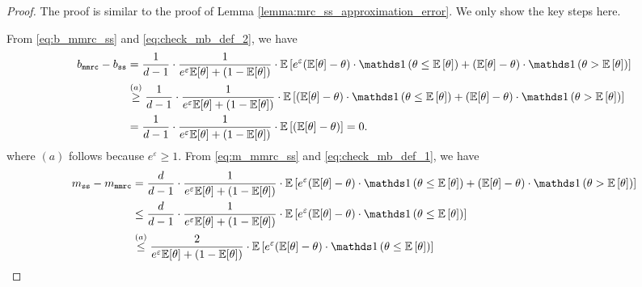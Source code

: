 \begin{proof}
The proof is similar to the proof of Lemma \ref{lemma:mrc_ss_approximation_error}. We only show the key steps here.

From \eqref{eq:b_mmrc_ss} and \eqref{eq:check_mb_def_2}, we have
\begin{align}
    b_\texttt{mmrc} - b_{\texttt{ss}} & =  \frac{1}{d-1} \cdot \frac{1}{e^\varepsilon \E [\theta] +(1-\E [\theta] )} \cdot \E\lb e^\varepsilon (\E [\theta]  - \theta) \cdot \Indicator \lp \theta \leq \E\lb \theta \rb \rp + (\E [\theta]  - \theta) \cdot \Indicator \lp \theta > \E\lb \theta \rb \rp \rb \\
    & \stackrel{(a)}{\geq} \frac{1}{d-1} \cdot \frac{1}{e^\varepsilon \E [\theta] +(1-\E [\theta] )} \cdot \E\lb  (\E [\theta]  - \theta) \cdot \Indicator \lp \theta \leq \E\lb \theta \rb \rp + (\E [\theta]  - \theta) \cdot \Indicator \lp \theta > \E\lb \theta \rb \rp \rb \\
    & = \frac{1}{d-1} \cdot \frac{1}{e^\varepsilon \E [\theta] +(1-\E [\theta] )} \cdot \E\lb (\E [\theta]  - \theta) \rb = 0.
\end{align}
where $(a)$ follows because $e^\varepsilon \geq 1$.
From \eqref{eq:m_mmrc_ss} and \eqref{eq:check_mb_def_1}, we have
\begin{align}
    m_{\texttt{ss}} - m_\texttt{mmrc} & = \frac{d}{d-1} \cdot \frac{1}{e^\varepsilon \E [\theta] +(1-\E [\theta] )} \cdot \E\lb e^\varepsilon (\E [\theta]  - \theta) \cdot \Indicator \lp \theta \leq \E\lb \theta \rb \rp + (\E [\theta]  - \theta) \cdot \Indicator \lp \theta > \E\lb \theta \rb \rp \rb \\
    & \leq \frac{d}{d-1} \cdot \frac{1}{e^\varepsilon \E [\theta] +(1-\E [\theta] )} \cdot \E\lb e^\varepsilon (\E [\theta]  - \theta) \cdot \Indicator \lp \theta \leq \E\lb \theta \rb \rp \rb\\
    & \stackrel{(a)}{\leq}  \frac{2}{e^\varepsilon \E [\theta] +(1-\E [\theta] )} \cdot \E\lb e^\varepsilon (\E [\theta]  - \theta) \cdot \Indicator \lp \theta \leq \E\lb \theta \rb \rp \rb \label{eq:ss_mmrc_minus_m1}

\end{align}
\end{proof}
